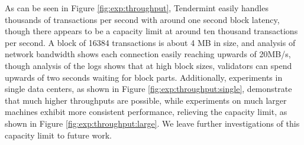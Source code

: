 As can be seen in Figure \ref{fig:exp:throughput},
Tendermint easily handles thousands of transactions per second with around one second block latency,
though there appears to be a capacity limit at around ten thousand transactions per second.
A block of 16384 transactions is about 4 MB in size, and analysis of network bandwidth shows each connection
easily reaching upwards of 20MB/s, though analysis of the logs shows that at high block sizes, 
validators can spend upwards of two seconds waiting for block parts.
Additionally, experiments in single data centers, as shown in Figure \ref{fig:exp:throughput:single},
demonstrate that much higher throughputs are possible,
while experiments on much larger machines exhibit more consistent performance,
relieving the capacity limit, as shown in Figure \ref{fig:exp:throughput:large}.
We leave further investigations of this capacity limit to future work.

